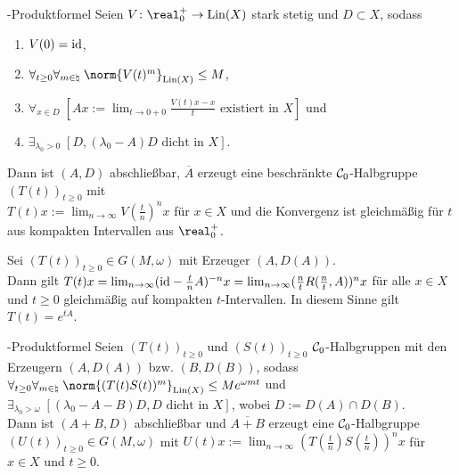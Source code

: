 \begin{Satz}{-Produktformel}
    Seien $V\colon \real_0^+ \to \Lin(X)$ stark stetig und $D \subset X$, sodass
    \begin{enumerate}
        \item
        $V(0) = \text{id}$,

        \item
        $\forall_{t \ge 0} \forall_{m \in \natural}\; \norm{V(t)^m}_{\Lin(X)} \le M$,

        \item
        $\forall_{x \in D}\;
        [\text{$Ax := \lim_{t \to 0+0} \frac{V(t)x - x}{t}$ existiert in $X$}]$ und

        \item
        $\exists_{\lambda_0 > 0}\; [\text{$D, (\lambda_0 - A)D$ dicht in $X$}]$.
    \end{enumerate}
    Dann ist $(A, D)$ abschließbar, $\overline{A}$ erzeugt eine beschränkte $\mathcal{C}_0$-Halbgruppe
    $(T(t))_{t \ge 0}$ mit\\
    $T(t)x := \lim_{n \to \infty} V(\frac{t}{n})^n x$ für $x \in X$ und
    die Konvergenz ist gleichmäßig für $t$ aus kompakten Intervallen aus $\real^+_0$.
\end{Satz}

\begin{Bsp}
    Sei $(T(t))_{t \ge 0} \in G(M, \omega)$ mit Erzeuger $(A, D(A))$.\\
    Dann gilt $T(t)x = \lim_{n \to \infty} (\text{id} - \frac{t}{n} A)^{-n} x
    = \lim_{n \to \infty} (\frac{n}{t} R(\frac{n}{t}, A))^n x$ für alle $x \in X$ und $t \ge 0$
    gleichmäßig auf kompakten $t$-Intervallen.
    In diesem Sinne gilt $T(t) = e^{tA}$.
\end{Bsp}

\linie

\begin{Satz}{-Produktformel}
    Seien $(T(t))_{t \ge 0}$ und $(S(t))_{t \ge 0}$ $\mathcal{C}_0$-Halbgruppen mit den Erzeugern
    $(A, D(A))$ bzw. $(B, D(B))$, sodass $\forall_{t \ge 0} \forall_{m \in \natural}\;
    \norm{(T(t)S(t))^m}_{\Lin(X)} \le Me^{\omega mt}$ und\\
    $\exists_{\lambda_0 > \omega}\; [\text{$(\lambda_0 - A - B)D, D$ dicht in $X$}]$, wobei
    $D := D(A) \cap D(B)$.\\
    Dann ist $(A + B, D)$ abschließbar und $\overline{A + B}$ erzeugt eine
    $\mathcal{C}_0$-Halbgruppe $(U(t))_{t \ge 0} \in G(M, \omega)$ mit
    $U(t)x := \lim_{n \to \infty} (T(\frac{t}{n}) S(\frac{t}{n}))^n x$ für $x \in X$ und $t \ge 0$.
\end{Satz}

